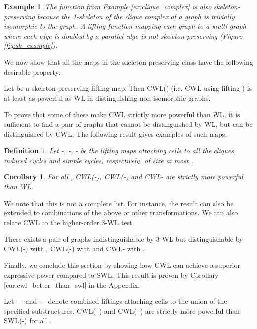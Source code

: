 \documentclass{article}
\newtheorem{definition}[theorem]{Definition}
\newtheorem{corollary}[theorem]{Corollary}
\newtheorem{example}[theorem]{Example}
\begin{document}
\begin{example}
\label{ex:skeleton-lift}
The function from Example \ref{ex:clique_complex} is also skeleton-preserving because the 1-skeleton of the clique complex of a graph is trivially isomorphic to the graph. A lifting function mapping each graph to a multi-graph where each edge is doubled by a parallel edge is not skeleton-preserving (Figure \ref{fig:sk_example}). 
\end{example}

We now show that all the maps in the skeleton-preserving class have the following desirable property: 

\begin{theorem}
\label{thm:skeleton}
Let  be a skeleton-preserving lifting map. Then CWL() (i.e. CWL using lifting ) is at least as powerful as WL in distinguishing non-isomorphic graphs.  
\end{theorem}

To prove that some of these make CWL strictly more powerful than WL, it is sufficient to find a pair of graphs that cannot be distinguished by WL, but can be distinguished by CWL. The following result gives examples of such maps. 

\begin{definition}
Let -, -, - be the lifting maps attaching cells to all the cliques, induced cycles and simple cycles, respectively, of size at most .  
\end{definition}

\begin{corollary}
\label{cor:WL_lifting_maps}
For all , CWL(-), CWL(-) and CWL- are strictly more powerful than WL.   
\end{corollary}

We note that this is not a complete list. For instance, the result can also be extended to combinations of the above or other transformations. We can also relate CWL to the higher-order 3-WL test.  

\begin{theorem}
\label{thm:lifting3WL}
There exists a pair of graphs indistinguishable by 3-WL but distinguishable by CWL(-) with , CWL(-) with  and CWL- with .
\end{theorem}

Finally, we conclude this section by showing how CWL can achieve a superior expressive power compared to SWL. This result is proven by Corollary \ref{cor:cwl_better_than_swl} in the Appendix. 

\begin{theorem}
Let -  - and -  - denote combined liftings attaching cells to the union of the specified substructures. CWL(--) and CWL(--) are strictly more powerful than SWL(-) for all . 
\end{theorem}
\end{document}

